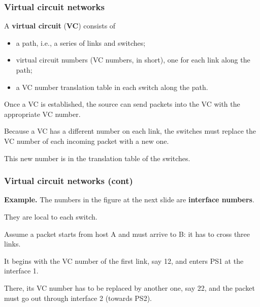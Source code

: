 %
\begin{frame}
\frametitle{Virtual circuit networks}

A \textbf{virtual circuit} (\textbf{VC}) consists of
\begin{itemize}

  \item a path, i.e., a series of links and switches;

  \item virtual circuit numbers (VC numbers, in short), one for each
  link along the path;

  \item a VC number translation table in each switch along the path.

\end{itemize}
Once a VC is established, the source can send packets into the VC with
the appropriate VC number.

\bigskip

Because a VC has a different number on each link, the switches must
replace the VC number of each incoming packet with a new one.

\bigskip

This new number is in the translation table of the switches.

\end{frame}

%
\begin{frame}
\frametitle{Virtual circuit networks (cont)}

\textbf{Example.} The numbers in the figure at the next slide are
\textbf{interface numbers}.

\bigskip

They are local to each switch.

\bigskip

Assume a packet starts from host A and must arrive to B: it has to
cross three links. 

\bigskip

It begins with the VC number of the first link, say
12, and enters PS1 at the interface 1. 

\bigskip

There, its VC number has to be replaced by another one, say 22, and
the packet must go out through interface 2 (towards PS2).

\end{frame}



